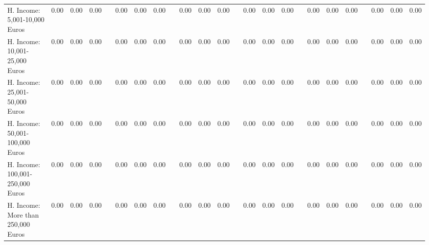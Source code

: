 \begin{center}
{\begin{longtable}{L{12em} c c c p{1.2em} c c c p{1.2em} c c c p{1.2em} c c c p{1.2em} c c c p{1.2em} c c c}
H. Income: 5,001-10,000 Euros & 0.00 &      0.00 &      0.00 & &      0.00 &      0.00 &      0.00 & &      0.00 &      0.00 &      0.00 & &      0.00 &      0.00 &      0.00 & &      0.00 &      0.00 &      0.00 & &      0.00 &      0.00 &      0.00 \\[.3em]
H. Income: 10,001-25,000 Euros & 0.00 &      0.00 &      0.00 & &      0.00 &      0.00 &      0.00 & &      0.00 &      0.00 &      0.00 & &      0.00 &      0.00 &      0.00 & &      0.00 &      0.00 &      0.00 & &      0.00 &      0.00 &      0.00 \\[.3em]
H. Income: 25,001-50,000 Euros & 0.00 &      0.00 &      0.00 & &      0.00 &      0.00 &      0.00 & &      0.00 &      0.00 &      0.00 & &      0.00 &      0.00 &      0.00 & &      0.00 &      0.00 &      0.00 & &      0.00 &      0.00 &      0.00 \\[.3em]
H. Income: 50,001-100,000 Euros & 0.00 &      0.00 &      0.00 & &      0.00 &      0.00 &      0.00 & &      0.00 &      0.00 &      0.00 & &      0.00 &      0.00 &      0.00 & &      0.00 &      0.00 &      0.00 & &      0.00 &      0.00 &      0.00 \\[.3em]
H. Income: 100,001-250,000 Euros & 0.00 &      0.00 &      0.00 & &      0.00 &      0.00 &      0.00 & &      0.00 &      0.00 &      0.00 & &      0.00 &      0.00 &      0.00 & &      0.00 &      0.00 &      0.00 & &      0.00 &      0.00 &      0.00 \\[.3em]
H. Income: More than 250,000 Euros & 0.00 &      0.00 &      0.00 & &      0.00 &      0.00 &      0.00 & &      0.00 &      0.00 &      0.00 & &      0.00 &      0.00 &      0.00 & &      0.00 &      0.00 &      0.00 & &      0.00 &      0.00 &      0.00 \\[.3em]
\hline
\end{longtable}
}
\end{center}
